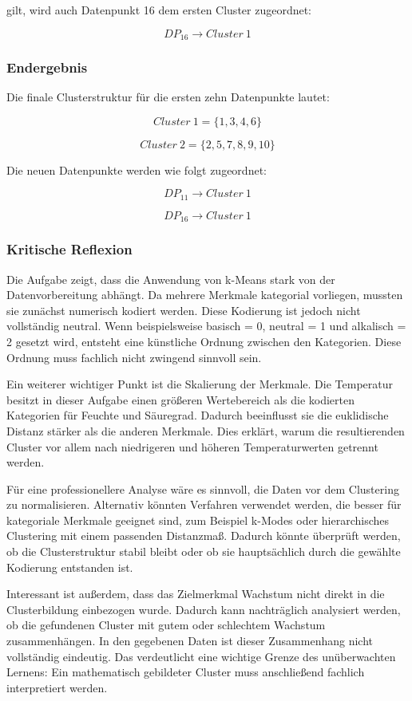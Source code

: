 \documentclass[12pt,a4paper]{article}
\begin{document}
gilt, wird auch Datenpunkt 16 dem ersten Cluster zugeordnet:

\[
DP_{16} \rightarrow Cluster\ 1
\]

\subsubsection{Endergebnis}

Die finale Clusterstruktur für die ersten zehn Datenpunkte lautet:

\[
Cluster\ 1 = \{1,3,4,6\}
\]

\[
Cluster\ 2 = \{2,5,7,8,9,10\}
\]

Die neuen Datenpunkte werden wie folgt zugeordnet:

\[
DP_{11} \rightarrow Cluster\ 1
\]

\[
DP_{16} \rightarrow Cluster\ 1
\]

\subsubsection{Kritische Reflexion}

Die Aufgabe zeigt, dass die Anwendung von k-Means stark von der Datenvorbereitung abhängt. Da mehrere Merkmale kategorial vorliegen, mussten sie zunächst numerisch kodiert werden. Diese Kodierung ist jedoch nicht vollständig neutral. Wenn beispielsweise basisch = 0, neutral = 1 und alkalisch = 2 gesetzt wird, entsteht eine künstliche Ordnung zwischen den Kategorien. Diese Ordnung muss fachlich nicht zwingend sinnvoll sein.

Ein weiterer wichtiger Punkt ist die Skalierung der Merkmale. Die Temperatur besitzt in dieser Aufgabe einen größeren Wertebereich als die kodierten Kategorien für Feuchte und Säuregrad. Dadurch beeinflusst sie die euklidische Distanz stärker als die anderen Merkmale. Dies erklärt, warum die resultierenden Cluster vor allem nach niedrigeren und höheren Temperaturwerten getrennt werden.

Für eine professionellere Analyse wäre es sinnvoll, die Daten vor dem Clustering zu normalisieren. Alternativ könnten Verfahren verwendet werden, die besser für kategoriale Merkmale geeignet sind, zum Beispiel k-Modes oder hierarchisches Clustering mit einem passenden Distanzmaß. Dadurch könnte überprüft werden, ob die Clusterstruktur stabil bleibt oder ob sie hauptsächlich durch die gewählte Kodierung entstanden ist.

Interessant ist außerdem, dass das Zielmerkmal Wachstum nicht direkt in die Clusterbildung einbezogen wurde. Dadurch kann nachträglich analysiert werden, ob die gefundenen Cluster mit gutem oder schlechtem Wachstum zusammenhängen. In den gegebenen Daten ist dieser Zusammenhang nicht vollständig eindeutig. Das verdeutlicht eine wichtige Grenze des unüberwachten Lernens: Ein mathematisch gebildeter Cluster muss anschließend fachlich interpretiert werden.
\end{document}
